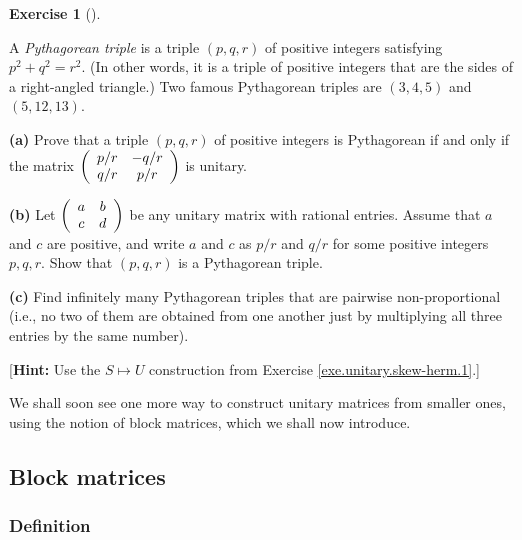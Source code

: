 \documentclass[numbers=enddot,12pt,final,onecolumn,notitlepage]{scrartcl}%
\newcounter{exer}
\numberwithin{exer}{subsection}
\theoremstyle{definition}
\newtheorem{exmp}[exer]{Exercise}
\newenvironment{exercise}[1][]
{\begin{exmp}[#1]\begin{leftbar}}
{\end{leftbar}\end{exmp}}
\begin{document}
\begin{exercise}
\label{exe.unitary.skew-herm.pyth} A \emph{Pythagorean triple} is a
triple $\left(  p,q,r\right)  $ of positive integers satisfying $p^{2}%
+q^{2}=r^{2}$. (In other words, it is a triple of positive integers that are
the sides of a right-angled triangle.) Two famous Pythagorean triples are
$\left(  3,4,5\right)  $ and $\left(  5,12,13\right)  $. \medskip

\textbf{(a)} Prove that a triple $\left(  p,q,r\right)  $ of positive integers
is Pythagorean if and only if the matrix $\left(
\begin{array}
[c]{cc}%
p/r & -q/r\\
q/r & p/r
\end{array}
\right)  $ is unitary. \medskip

\textbf{(b)} Let $\left(
\begin{array}
[c]{cc}%
a & b\\
c & d
\end{array}
\right)  $ be any unitary matrix with rational entries. Assume that $a$ and
$c$ are positive, and write $a$ and $c$ as $p/r$ and $q/r$ for some positive
integers $p,q,r$. Show that $\left(  p,q,r\right)  $ is a Pythagorean triple.
\medskip

\textbf{(c)} Find infinitely many Pythagorean triples that are pairwise
non-proportional (i.e., no two of them are obtained from one another just by
multiplying all three entries by the same number). \medskip

[\textbf{Hint:} Use the $S\mapsto U$ construction from Exercise
\ref{exe.unitary.skew-herm.1}.]
\end{exercise}

We shall soon see one more way to construct unitary matrices from smaller
ones, using the notion of block matrices, which we shall now introduce.

\subsection{Block matrices}

\subsubsection{Definition}
\end{document}
